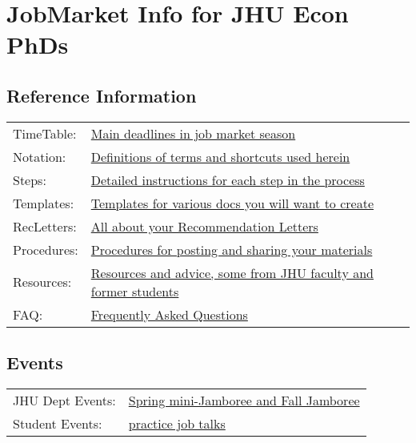 \documentclass{\econtex}
\begin{document}
\medskip


\section*{JobMarket Info for JHU Econ PhDs}
\subsection*{Reference Information}

\medskip

\begin{tabular}{ll}
  TimeTable:  & \href{\pageurl/TimeTable}{Main deadlines in job market season} \\
  Notation:   & \href{\pageurl/Notation}{Definitions of terms and shortcuts used herein} \\
  Steps:      & \href{\pageurl/Steps}{Detailed instructions for each step in the process} \\
  Templates:  & \href{\bloburl/Templates}{Templates for various docs you will want to create} \\
  RecLetters: & \href{\pageurl/RecLetters}{All about your Recommendation Letters} \\
  Procedures: & \href{\bloburl/JobMarketProceduresHelp.md}{Procedures for posting and sharing your materials} \\
  Resources:  & \href{\bloburl/Resources}{Resources and advice, some from JHU faculty and former students} \\
  FAQ:        & \href{\pageurl/FAQ}{Frequently Asked Questions} \\
\end{tabular}

\medskip

\subsection*{Events}
\begin{tabular}{ll}
  JHU Dept Events: & \href{\pageurl/Jamborees}{Spring mini-Jamboree and Fall Jamboree} \\
  Student Events: &  \href{https://jh.hosted.panopto.com/Panopto/Pages/Sessions/List.aspx?folderID=4a25e803-cd94-4e31-b350-b00500e50267}{practice job talks}
\end{tabular}
\end{document}
